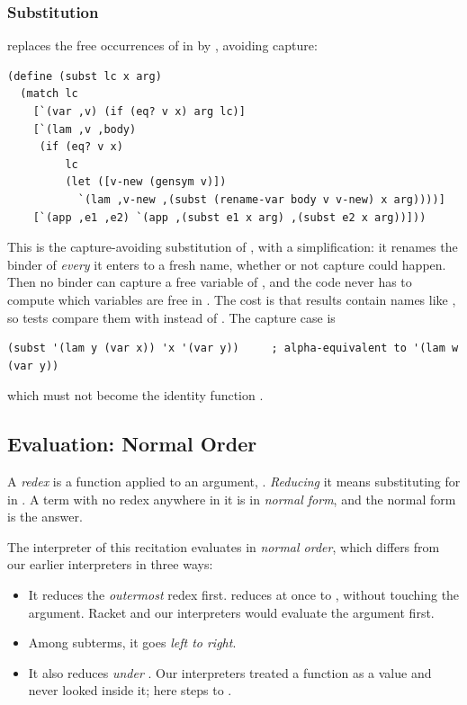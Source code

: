 \subsubsection{Substitution}  replaces the free occurrences of  in  by , avoiding capture:
\begin{lstlisting}
(define (subst lc x arg)
  (match lc
    [`(var ,v) (if (eq? v x) arg lc)]
    [`(lam ,v ,body)
     (if (eq? v x)
         lc
         (let ([v-new (gensym v)])
           `(lam ,v-new ,(subst (rename-var body v v-new) x arg))))]
    [`(app ,e1 ,e2) `(app ,(subst e1 x arg) ,(subst e2 x arg))]))
\end{lstlisting}
This is the capture-avoiding substitution of , with a simplification: it renames the binder of \emph{every}  it enters to a fresh name, whether or not capture could happen. Then no binder can capture a free variable of , and the code never has to compute which variables are free in . The cost is that results contain names like , so tests compare them with  instead of . The capture case is
\begin{lstlisting}
(subst '(lam y (var x)) 'x '(var y))     ; alpha-equivalent to '(lam w (var y))
\end{lstlisting}
which must not become the identity function .

\subsection{Evaluation: Normal Order}

\begin{definition}
A \emph{redex} is a function applied to an argument, . \emph{Reducing} it means substituting  for  in . A term with no redex anywhere in it is in \emph{normal form}, and the normal form is the answer.
\end{definition}

The interpreter of this recitation evaluates in \emph{normal order}, which differs from our earlier interpreters in three ways:
\begin{itemize}
  \item It reduces the \emph{outermost} redex first.  reduces at once to , without touching the argument. Racket and our interpreters would evaluate the argument first.
  \item Among subterms, it goes \emph{left to right}.
  \item It also reduces \emph{under} . Our interpreters treated a function as a value and never looked inside it; here  steps to .
\end{itemize}

